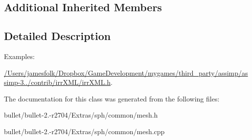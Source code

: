 \subsection*{Additional Inherited Members}


\subsection{Detailed Description}
\begin{Desc}
\item[Examples\+: ]\par
\hyperlink{_2_users_2jamesfolk_2_dropbox_2_game_development_2mygames_2third_party_2assimp_2assimp-3_81_81_2b1dcc9df1e93e2ac9c863740ad4632a8}{/\+Users/jamesfolk/\+Dropbox/\+Game\+Development/mygames/third\+\_\+party/assimp/assimp-\/3../contrib/irr\+X\+M\+L/irr\+X\+M\+L.\+h}.\end{Desc}


The documentation for this class was generated from the following files\+:\begin{DoxyCompactItemize}
\item 
bullet/bullet-\/2.-\/r2704/\+Extras/sph/common/mesh.\+h\item 
bullet/bullet-\/2.-\/r2704/\+Extras/sph/common/mesh.\+cpp\end{DoxyCompactItemize}

